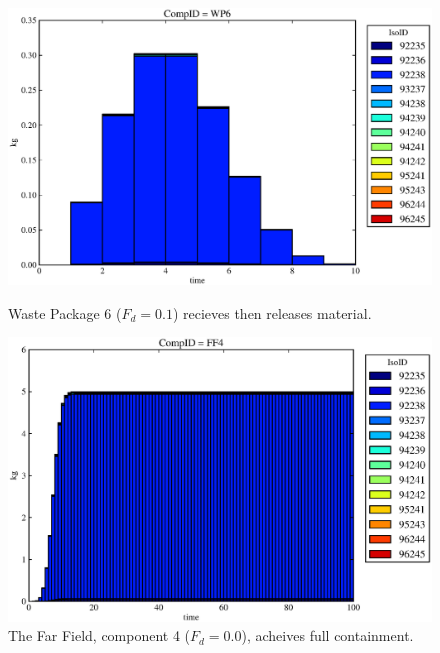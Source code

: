 \begin{figure}[ht]
\begin{minipage}[b]{0.45\linewidth}
\end{minipage}
\hspace{0.05\linewidth}
\begin{minipage}[b]{0.45\linewidth}
  \includegraphics[width=\textwidth]{./chapters/demonstration/base/mcI2.eps}
  \caption[Case MCI Waste Package Contaminants.]{ 
    Waste Package 6 ($F_d = 0.1$) recieves then releases material.
    }
  \label{fig:mcIwp6}

  \includegraphics[width=\textwidth]{./chapters/demonstration/base/mcI0.eps}
  \caption[Case MCI Waste Package Contaminants.]{ 
    The Far Field, component 4 ($F_d = 0.0$), acheives full containment.
    }
  \label{fig:mcIff0}


  \end{minipage}
\end{figure}

